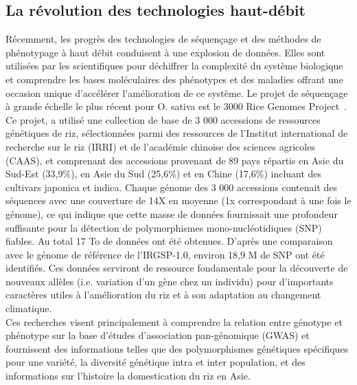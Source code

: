 \subsection{La révolution des technologies haut-débit}
Récemment, les progrès des technologies de séquençage et des méthodes de phénotypage à haut débit conduisent à une explosion de données. Elles sont utilisées par les scientifiques pour déchiffrer la complexité du système biologique et comprendre les bases moléculaires des phénotypes et des maladies offrant une occasion unique d’accélérer l’amélioration de ce système. Le projet de séquençage à grande échelle le plus récent pour O. sativa est le 3000 Rice Genomes Project~\cite{3KRG_2018}. Ce projet, a utilisé une collection de base de 3 000 accessions de ressources génétiques de riz, sélectionnées parmi des ressources de l'Institut international de recherche sur le riz (IRRI) et de l'académie chinoise des sciences agricoles (CAAS), et comprenant des accessions provenant de 89 pays répartis en Asie du Sud-Est (33,9\%), en Asie du Sud (25,6\%) et en Chine (17,6\%) incluant des cultivars japonica et indica. Chaque génome des 3 000 accessions contenait des séquences avec une couverture de 14X en moyenne (1x correspondant à une fois le génome), ce qui indique que cette masse de données fournissait une profondeur suffisante pour la détection de polymorphismes mono-nucléotidiques (SNP) fiables. Au total 17 To de données ont été obtenues. D'après une comparaison avec le génome de référence de l'IRGSP-1.0, environ 18,9 M de SNP ont été identifiés. Ces données serviront de ressource fondamentale pour la découverte de nouveaux allèles (i.e. variation d'un gène chez un individu) pour d'importants caractères utiles à l'amélioration du riz et à son adaptation au changement climatique. \\ 

Ces recherches visent principalement à comprendre la relation entre génotype et phénotype sur la base d'études d'association pan-génomique (GWAS) et fournissent des informations telles que des polymorphismes génétiques spécifiques pour une variété, la diversité génétique intra et inter population, et des informations sur l'histoire la domestication du riz en Asie.\\

